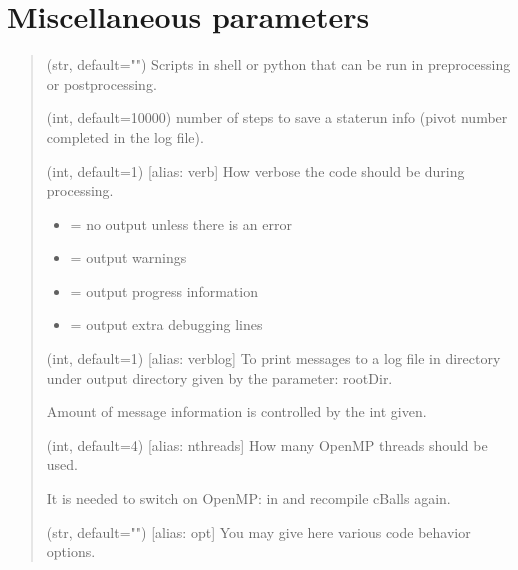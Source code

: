 \documentclass[letterpaper,10pt,english]{sphinxmanual}
\begin{document}
\section{Miscellaneous parameters}
\label{\detokenize{params:miscellaneous-parameters}}\begin{quote}\begin{description}
\sphinxAtStartPar
(str, default="") Scripts in shell or python that can be run in pre\sphinxhyphen{}processing or post\sphinxhyphen{}processing.

\sphinxAtStartPar
(int, default=10000) number of steps to save a state\sphinxhyphen{}run info (pivot number completed in the log file).

\sphinxAtStartPar
(int, default=1) {[}alias: verb{]} How verbose the code should be during processing.
\begin{itemize}
\item {} 
 = no output unless there is an error

\item {} 
 = output warnings

\item {} 
 = output progress information

\item {} 
 = output extra debugging lines

\end{itemize}

\sphinxAtStartPar
(int, default=1) {[}alias: verblog{]} To print messages to a log file  in directory  under output directory given by the parameter: {\color{red}\bfseries{}\textasciigrave{}\textasciigrave{}}rootDir\textasciigrave{}.

\sphinxAtStartPar
Amount of message information is controlled by the int given.

\sphinxAtStartPar
(int, default=4) {[}alias: nthreads{]} How many OpenMP threads should be used.

\sphinxAtStartPar
It is needed to switch on OpenMP:  in  and recompile cBalls again.

\sphinxAtStartPar
(str, default="") {[}alias: opt{]} You may give here various code behavior options.


\end{description}
\end{quote}
\end{document}
